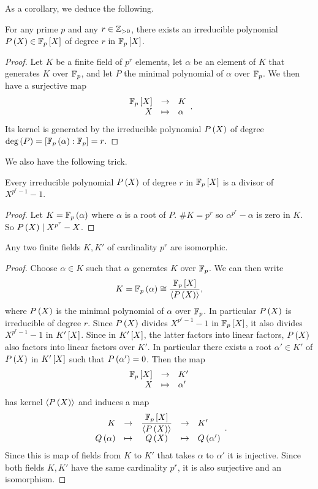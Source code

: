 As a corollary, we deduce the following.

\begin{proposition}
For any prime $ p $ and any $ r \in \Z_{> 0} $, there exists an irreducible polynomial $ P\rb{X} \in \F_p\sb{X} $ of degree $ r $ in $ \F_p\sb{X} $.
\end{proposition}

\begin{proof}
Let $ K $ be a finite field of $ p^r $ elements, let $ \alpha $ be an element of $ K $ that generates $ K $ over $ \F_p $, and let $ P $ the minimal polynomial of $ \alpha $ over $ \F_p $. We then have a surjective map
$$ \function{\F_p\sb{X}}{K}{X}{\alpha}. $$
Its kernel is generated by the irreducible polynomial $ P\rb{X} $ of degree $ \deg\rb{P} = \sb{\F_p\rb{\alpha} : \F_p} = r $.
\end{proof}

We also have the following trick.

\begin{lemma}
Every irreducible polynomial $ P\rb{X} $ of degree $ r $ in $ \F_p\sb{X} $ is a divisor of $ X^{p^r - 1} - 1 $.
\end{lemma}

\begin{proof}
Let $ K = \F_p\rb{\alpha} $ where $ \alpha $ is a root of $ P $. $ \#K = p^r $ so $ \alpha^{p^r} - \alpha $ is zero in $ K $. So $ P\rb{X} \mid X^{p^r} - X $.
\end{proof}

\begin{corollary}
Any two finite fields $ K, K' $ of cardinality $ p^r $ are isomorphic.
\end{corollary}

\begin{proof}
Choose $ \alpha \in K $ such that $ \alpha $ generates $ K $ over $ \F_p $. We can then write
$$ K = \F_p\rb{\alpha} \cong \dfrac{\F_p\sb{X}}{\ab{P\rb{X}}}, $$
where $ P\rb{X} $ is the minimal polynomial of $ \alpha $ over $ \F_p $. In particular $ P\rb{X} $ is irreducible of degree $ r $. Since $ P\rb{X} $ divides $ X^{p^r - 1} - 1 $ in $ \F_p\sb{X} $, it also divides $ X^{p^r - 1} - 1 $ in $ K'\sb{X} $. Since in $ K'\sb{X} $, the latter factors into linear factors, $ P\rb{X} $ also factors into linear factors over $ K' $. In particular there exists a root $ \alpha' \in K' $ of $ P\rb{X} $ in $ K'\sb{X} $ such that $ P\rb{\alpha'} = 0 $. Then the map
$$ \function{\F_p\sb{X}}{K'}{X}{\alpha'} $$
has kernel $ \ab{P\rb{X}} $ and induces a map
$$
\begin{array}{rcccl}
K & \to & \dfrac{\F_p\sb{X}}{\ab{P\rb{X}}} & \to & K' \\
Q\rb{\alpha} & \mapsto & Q\rb{X} & \mapsto & Q\rb{\alpha'}
\end{array}.
$$
Since this is map of fields from $ K $ to $ K' $ that takes $ \alpha $ to $ \alpha' $ it is injective. Since both fields $ K, K' $ have the same cardinality $ p^r $, it is also surjective and an isomorphism.
\end{proof}

